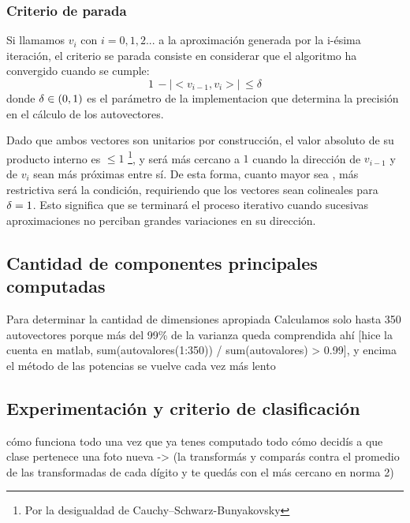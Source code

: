 \subsubsection{Criterio de parada}

Si llamamos $v_i$ con $i = 0, 1, 2 ...$ a la aproximación generada por la i-ésima iteración, el criterio se parada consiste en considerar que el algoritmo ha convergido cuando se cumple:
$$ 1\, - \left | <v_{i-1}, v_{i}> \right | \, \leq \delta $$
donde $\delta \in \left ( 0, 1 \right )$ es el parámetro de la implementacion que determina la precisión en el cálculo de los autovectores.

Dado que ambos vectores son unitarios por construcción, el valor absoluto de su producto interno es $\leq 1$ \footnote{Por la desigualdad de Cauchy–Schwarz-Bunyakovsky}, y será más cercano a $1$ cuando la dirección de $v_{i-1}$ y de $v_{i}$ sean más próximas entre sí. De esta forma, cuanto mayor sea \delt, más restrictiva será la condición, requiriendo que los vectores sean colineales para $\delta = 1$. Esto significa que se terminará el proceso iterativo cuando sucesivas aproximaciones no perciban grandes variaciones en su dirección.

\subsection{Cantidad de componentes principales computadas}

Para determinar la cantidad de dimensiones apropiada 
Calculamos solo hasta 350 autovectores porque más del 99\% de la varianza queda comprendida ahí [hice la cuenta en matlab, sum(autovalores(1:350)) / sum(autovalores) > 0.99], y encima el método de las potencias se vuelve cada vez más lento

\subsection{Experimentación y criterio de clasificación}

cómo funciona todo una vez que ya tenes computado todo
cómo decidís a que clase pertenece una foto nueva -> (la transformás y comparás contra el promedio de las transformadas de cada dígito y te quedás con el más cercano en norma 2)
